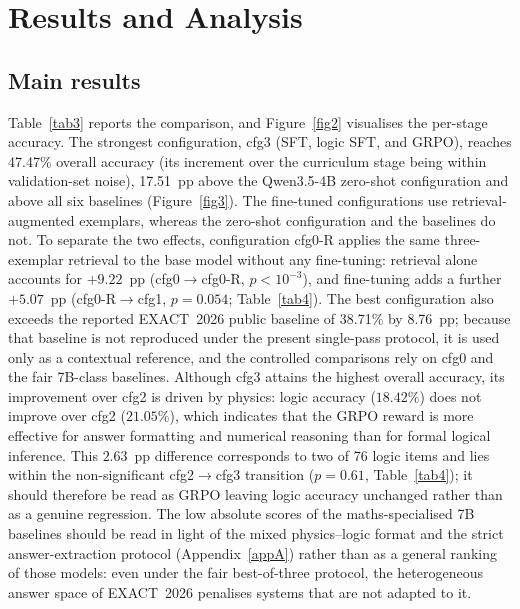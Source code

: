 \documentclass[APA,twocolumn]{USG}
\newcommand{\basemodelname}{Qwen3.5-4B}
\newcommand{\dataset}{EXACT~2026}
\begin{document}
\section{Results and Analysis}\label{sec6}

\subsection{Main results}
Table~\ref{tab3} reports the comparison, and Figure~\ref{fig2} visualises the
per-stage accuracy. The strongest configuration, cfg3 (SFT, logic SFT, and
GRPO), reaches 47.47\% overall accuracy (its increment over the curriculum stage
being within validation-set noise), 17.51~pp above the \basemodelname{}
zero-shot configuration and above all six baselines (Figure~\ref{fig3}). The
fine-tuned configurations use retrieval-augmented exemplars, whereas the
zero-shot configuration and the baselines do not. To separate the two effects,
configuration cfg0-R applies the same three-exemplar retrieval to the base model
without any fine-tuning: retrieval alone accounts for $+9.22$~pp
(cfg0$\rightarrow$cfg0-R, $p<10^{-3}$), and fine-tuning adds a further $+5.07$~pp
(cfg0-R$\rightarrow$cfg1, $p=0.054$; Table~\ref{tab4}). The best configuration
also exceeds the reported \dataset{}
public baseline of 38.71\% by 8.76~pp; because that baseline is not reproduced
under the present single-pass protocol, it is used only as a contextual
reference, and the controlled comparisons rely on cfg0 and the fair 7B-class
baselines. Although cfg3 attains the highest overall accuracy, its improvement
over cfg2 is driven by physics: logic accuracy ($18.42\%$) does not improve over
cfg2 ($21.05\%$), which indicates that the GRPO reward is more effective for
answer formatting and numerical reasoning than for formal logical inference. This
$2.63$~pp difference corresponds to two of 76 logic items and lies within the
non-significant cfg2$\rightarrow$cfg3 transition ($p=0.61$, Table~\ref{tab4}); it
should therefore be read as GRPO leaving logic accuracy unchanged rather than as
a genuine regression. The
low absolute scores of the maths-specialised 7B baselines should be read in light
of the mixed physics--logic format and the strict answer-extraction protocol
(Appendix~\ref{appA}) rather than as a general ranking of those models: even
under the fair best-of-three protocol, the heterogeneous answer space of
\dataset{} penalises systems that are not adapted to it.
\end{document}
